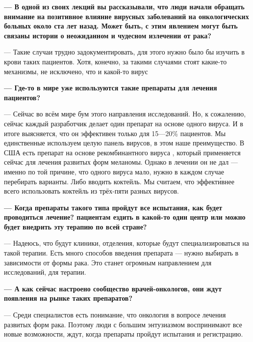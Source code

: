 {\bf --- В одной из своих лекций вы рассказывали, что люди начали обращать внимание на позитивное влияние вирусных заболеваний на онкологических больных около ста лет назад. Может быть, с этим явлением могут быть  связаны истории о неожиданном и чудесном излечении от рака?}

--- Такие случаи трудно задокументировать, для этого нужно было бы изучить  в крови таких пациентов. Хотя, конечно, за такими случаями стоят какие-то механизмы, не исключено, что и какой-то вирус

{\bf --- Где-то в мире уже используются такие препараты для лечения пациентов?}

--- Сейчас во всём мире  бум этого направления исследований. Но, к сожалению, сейчас каждый разработчик делает один препарат на основе одного вируса. И в итоге выясняется, что он эффективен только для 15---20\% пациентов. Мы единственные используем целую панель вирусов, в этом наше преимущество. В США есть препарат на основе рекомбинантного вируса , который применяется сейчас для лечения развитых форм меланомы. Однако  в лечении он не дал --- именно по той причине, что одного вируса мало, нужно в каждом случае перебирать варианты. Либо вводить коктейль. Мы считаем, что эффект\'{и}внее всего использовать коктейль из трёх-пяти разных вирусов.

{\bf --- Когда препараты такого типа пройдут все испытания, как будет проводиться лечение?  пациентам ездить в какой-то один центр или можно будет внедрить эту терапию по всей стране?}

--- Надеюсь, что будут клиники, отделения, которые будут специализироваться на такой терапии. Есть много способов введения препарата --- нужно выбирать в зависимости от формы рака. Это станет огромным направлением для исследований, для терапии.

{\bf --- А как сейчас настроено сообщество врачей-онкологов, они ждут появления на рынке таких препаратов?}

--- Среди специалистов есть понимание, что онкология  в вопросе лечения развитых форм рака. Поэтому люди с большим энтузиазмом воспринимают все новые возможности, ждут, когда препараты пройдут испытания и регистрацию.




